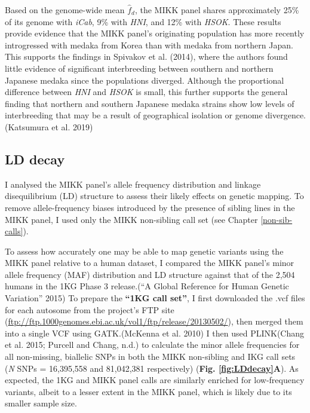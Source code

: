 \documentclass[
]{book}
\begin{document}
Based on the genome-wide mean \(\hat{f}_d\), the MIKK panel shares approximately 25\% of its genome with \emph{iCab}, 9\% with \emph{HNI}, and 12\% with \emph{HSOK}. These results provide evidence that the MIKK panel's originating population has more recently introgressed with medaka from Korea than with medaka from northern Japan. This supports the findings in Spivakov et al. (2014), where the authors found little evidence of significant interbreeding between southern and northern Japanese medaka since the populations diverged. Although the proportional difference between \emph{HNI} and \emph{HSOK} is small, this further supports the general finding that northern and southern Japanese medaka strains show low levels of interbreeding that may be a result of geographical isolation or genome divergence.(Katsumura et al. 2019)

\hypertarget{ld-decay-sec}{%
\subsection{LD decay}\label{ld-decay-sec}}

I analysed the MIKK panel's allele frequency distribution and linkage disequilibrium (LD) structure to assess their likely effects on genetic mapping. To remove allele-frequency biases introduced by the presence of sibling lines in the MIKK panel, I used only the MIKK non-sibling call set (see Chapter \ref{non-sib-calls}).

To assess how accurately one may be able to map genetic variants using the MIKK panel relative to a human dataset, I compared the MIKK panel's minor allele frequency (MAF) distribution and LD structure against that of the 2,504 humans in the 1KG Phase 3 release.({``A Global Reference for Human Genetic Variation''} 2015) To prepare the \textbf{``1KG call set''}, I first downloaded the .vcf files for each autosome from the project's FTP site (\url{ftp://ftp.1000genomes.ebi.ac.uk/vol1/ftp/release/20130502/}), then merged them into a single VCF using GATK.(McKenna et al. 2010) I then used PLINK(Chang et al. 2015; Purcell and Chang, n.d.) to calculate the minor allele frequencies for all non-missing, biallelic SNPs in both the MIKK non-sibling and IKG call sets (\emph{N} SNPs = 16,395,558 and 81,042,381 respectively) (\textbf{Fig. \ref{fig:LDdecay}A}). As expected, the 1KG and MIKK panel calls are similarly enriched for low-frequency variants, albeit to a lesser extent in the MIKK panel, which is likely due to its smaller sample size.
\end{document}
